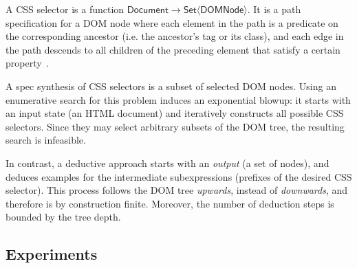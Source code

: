 \begin{scenario}
    A CSS selector is a function $\mathsf{Document} \to \mathsf{Set}\langle \mathsf{DOMNode}\rangle$.
    It is a path specification for a DOM node where each element in the path is a predicate on the corresponding
    ancestor (i.e.  the ancestor's tag or its class), and each edge in the path descends to all children of the
    preceding element that satisfy a certain property~\cite{css3selectors}.

    A spec synthesis of CSS selectors is a subset of selected DOM nodes.
    Using an enumerative search for this problem induces an exponential blowup: it starts with an input state (an HTML
    document) and iteratively constructs all possible CSS selectors.
    Since they may select arbitrary subsets of the DOM tree, the resulting search is infeasible.

    In contrast, a deductive approach starts with an \emph{output} (a set of nodes), and deduces examples for the
    intermediate subexpressions (prefixes of the desired CSS selector).
    This process follows the DOM tree \emph{upwards}, instead of \emph{downwards}, and therefore is by construction
    finite.
    Moreover, the number of deduction steps is bounded by the tree depth.
\end{scenario}

\subsection{Experiments}
\label{sec:prose:evaluation:experiments}
